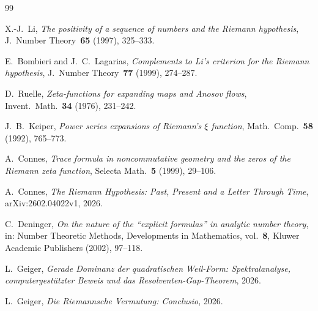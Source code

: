 \documentclass[12pt,a4paper]{article}
\theoremstyle{definition}
\theoremstyle{remark}
\begin{document}
\begin{thebibliography}{99}

X.-J.~Li, \emph{The positivity of a sequence of numbers and the Riemann hypothesis}, J.~Number Theory~\textbf{65} (1997), 325--333.

E.~Bombieri and J.~C.~Lagarias, \emph{Complements to Li's criterion for the Riemann hypothesis}, J.~Number Theory~\textbf{77} (1999), 274--287.

D.~Ruelle, \emph{Zeta-functions for expanding maps and Anosov flows}, Invent.~Math.~\textbf{34} (1976), 231--242.

J.~B.~Keiper, \emph{Power series expansions of Riemann's $\xi$ function}, Math.~Comp.~\textbf{58} (1992), 765--773.

A.~Connes, \emph{Trace formula in noncommutative geometry and the zeros of the Riemann zeta function}, Selecta Math.~\textbf{5} (1999), 29--106.

A.~Connes, \emph{The Riemann Hypothesis: Past, Present and a Letter Through Time}, arXiv:2602.04022v1, 2026.

C.~Deninger, \emph{On the nature of the ``explicit formulas'' in analytic number theory}, in: Number Theoretic Methods, Developments in Mathematics, vol.~\textbf{8}, Kluwer Academic Publishers (2002), 97--118.

L.~Geiger, \emph{Gerade Dominanz der quadratischen Weil-Form: Spektralanalyse, computergestützter Beweis und das Resolventen-Gap-Theorem}, 2026.

L.~Geiger, \emph{Die Riemannsche Vermutung: Conclusio}, 2026.

\end{thebibliography}
\end{document}
